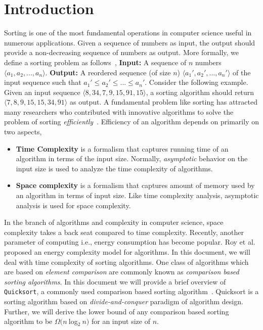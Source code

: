 \documentclass[10pt, twocolumn, a4paper]{article}
\let\bold\textbf
\let\ital\textit
\let\cour\texttt
\begin{document}
\section{Introduction}
Sorting is one of the most fundamental operations in computer science useful in numerous applications. Given a sequence of numbers as input, the output should provide a non-decreasing sequence of numbers as output. More formally, we define a sorting problem as follows~\cite{cormen},\newline
\bold{Input:} A sequence of $n$ numbers $\langle a_1,a_2,. . .,a_n\rangle$.\newline
\bold{Output:}  A reordered sequence (of size $n$) $\langle a_1',a_2',. . .,a_n'\rangle$ of the input sequence such that $a_1' \leq a_2' \leq . . . \leq a_n'$.\newline
Consider the following example. Given an input sequence $\langle8,34,7,9,15,91,15\rangle$, a sorting algorithm should return $\langle7,8,9,15,15,34,91\rangle$ as output. \newline
\indent A fundamental problem like sorting has attracted many researchers who contributed with innovative algorithms to solve the problem of sorting \ital{efficiently}~\cite{martin}. Efficiency of an algorithm depends on primarily on two aspects,
\begin{itemize}
  \item\bold{Time Complexity} is a formalism that captures running time of an algorithm in terms of the input size. Normally, \ital{asymptotic} behavior on the input size is used to analyze the time complexity of algorithms.
  \item\bold{Space complexity} is a formalism that captures amount of memory used by an algorithm in terms of input size. Like time complexity analysis, asymptotic analysis is used for space complexity.
\end{itemize}
In the branch of algorithms and complexity in computer science, space complexity takes a back seat compared to time complexity. Recently, another parameter of computing i.e., energy consumption has become popular. Roy et al.~\cite{roy} proposed an energy complexity model for algorithms. In this document, we will deal with time complexity of sorting algorithms.\newline
\indent One class of algorithms which are based on \ital{element comparison} are commonly known as \ital{comparison based sorting algorithms}. In this document we will provide a brief overview of \cour{Quicksort}, a commonly used comparison based sorting algorithm~\cite{hoare}. Quicksort is a sorting algorithm based on \ital{divide-and-conquer} paradigm of algorithm design. Further, we will derive the lower bound of any comparison based sorting algorithm to be $\Omega(n\:$log$_2\:n)$ for an input size of $n$.
\end{document}
